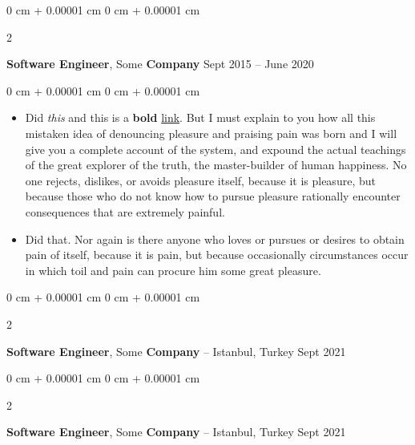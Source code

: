 \documentclass[10pt, letterpaper]{article}
\newenvironment{highlights}{
    \begin{itemize}[
        topsep=0.10 cm,
        parsep=0.10 cm,
        partopsep=0pt,
        itemsep=0pt,
        leftmargin=0 cm + 10pt
    ]
}{
    \end{itemize}
} %
\newenvironment{onecolentry}{
    \begin{adjustwidth}{
        0 cm + 0.00001 cm
    }{
        0 cm + 0.00001 cm
    }
}{
    \end{adjustwidth}
} %
\newenvironment{twocolentry}[2][]{
    \onecolentry
    \def\secondColumn{#2}
    \setcolumnwidth{\fill, 4.5 cm}
    \begin{paracol}{2}
}{
    \switchcolumn \raggedleft \secondColumn
    \end{paracol}
    \endonecolentry
} %
\begin{document}
        \vspace{0.2 cm}

        \begin{twocolentry}{
            Sept 2015 – June 2020
        }
            \textbf{Software Engineer}, Some \textbf{Company}\end{twocolentry}

        \vspace{0.10 cm}
        \begin{onecolentry}
            \begin{highlights}
                \item Did \textit{this} and this is a \textbf{bold} \href{https://example.com}{link}. But I must explain to you how all this mistaken idea of denouncing pleasure and praising pain was born and I will give you a complete account of the system, and expound the actual teachings of the great explorer of the truth, the master-builder of human happiness. No one rejects, dislikes, or avoids pleasure itself, because it is pleasure, but because those who do not know how to pursue pleasure rationally encounter consequences that are extremely painful.
                \item Did that. Nor again is there anyone who loves or pursues or desires to obtain pain of itself, because it is pain, but because occasionally circumstances occur in which toil and pain can procure him some great pleasure.
            \end{highlights}
        \end{onecolentry}


        \vspace{0.2 cm}

        \begin{twocolentry}{
            Sept 2021
        }
            \textbf{Software Engineer}, Some \textbf{Company} -- Istanbul, Turkey\end{twocolentry}



        \vspace{0.2 cm}

        \begin{twocolentry}{
            Sept 2021
        }
            \textbf{Software Engineer}, Some \textbf{Company} -- Istanbul, Turkey\end{twocolentry}
\end{document}
